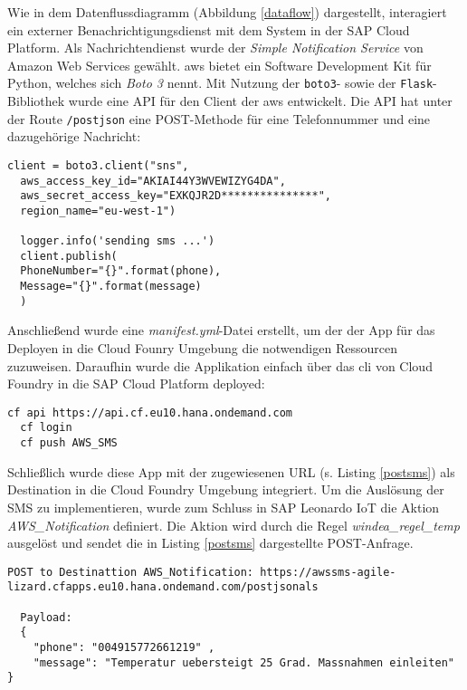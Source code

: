 Wie in dem Datenflussdiagramm (Abbildung \ref{dataflow}) dargestellt, interagiert ein externer Benachrichtigungsdienst mit dem System in der SAP Cloud Platform. Als Nachrichtendienst wurde der \textit{Simple Notification Service} von Amazon Web Services gewählt. \ac{aws} bietet ein Software Development Kit für Python, welches sich \textit{Boto 3} nennt. Mit Nutzung der \texttt{boto3}- sowie der \texttt{Flask}-Bibliothek wurde eine API für den Client der \ac{aws} entwickelt. Die API hat unter der Route \texttt{/postjson} eine POST-Methode für eine Telefonnummer und eine dazugehörige Nachricht:
\newline
\begin{lstlisting}[caption= Flask-API für AWS SNS]
  client = boto3.client("sns",
  aws_access_key_id="AKIAI44Y3WVEWIZYG4DA",
  aws_secret_access_key="EXKQJR2D***************",
  region_name="eu-west-1")

  logger.info('sending sms ...')
  client.publish(
  PhoneNumber="{}".format(phone),
  Message="{}".format(message)
  )
\end{lstlisting}
\vspace{5mm}
\noindent Anschließend wurde eine \textit{manifest.yml}-Datei erstellt, um der der App für das Deployen in die Cloud Founry Umgebung die notwendigen Ressourcen zuzuweisen. Daraufhin wurde die Applikation einfach über das \ac{cli} von Cloud Foundry in die SAP Cloud Platform deployed:
\begin{lstlisting}[caption= Deployment in die SAP Cloud Platform]
  cf api https://api.cf.eu10.hana.ondemand.com
  cf login
  cf push AWS_SMS
\end{lstlisting}

\noindent Schließlich wurde diese App mit der zugewiesenen URL (s. Listing \ref{postsms}) als Destination in die Cloud Foundry Umgebung integriert. Um die Auslösung der SMS zu implementieren, wurde zum Schluss in SAP Leonardo IoT die Aktion \textit{AWS\_Notification} definiert. Die Aktion wird durch die Regel \textit{windea\_regel\_temp} ausgelöst und sendet die in Listing \ref{postsms} dargestellte POST-Anfrage.
\newline
\begin{lstlisting}[caption=JSON Payload an Destination, label=postsms]
  POST to Destinattion AWS_Notification: https://awssms-agile-lizard.cfapps.eu10.hana.ondemand.com/postjsonals

  Payload:
  {
    "phone": "004915772661219" ,
    "message": "Temperatur uebersteigt 25 Grad. Massnahmen einleiten"
}
\end{lstlisting}


